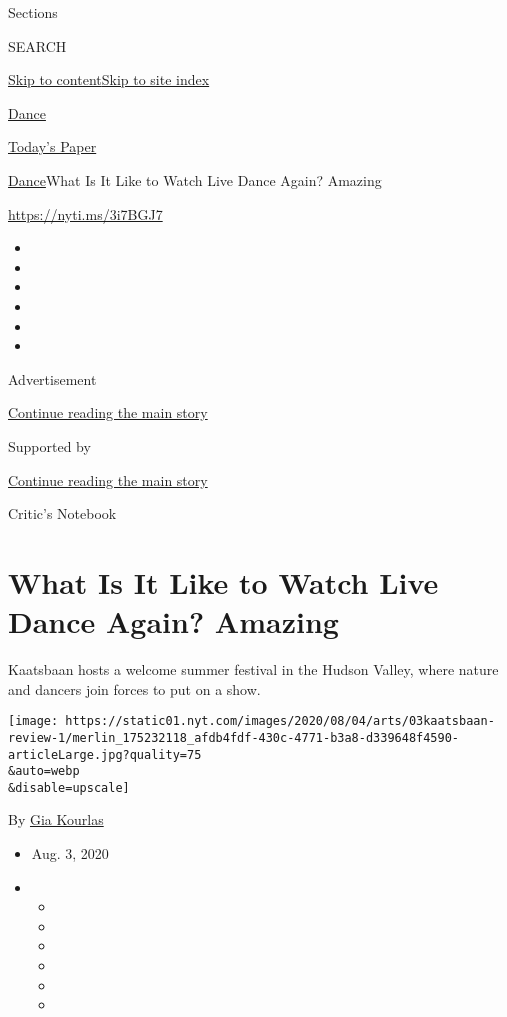 Sections

SEARCH

\protect\hyperlink{site-content}{Skip to
content}\protect\hyperlink{site-index}{Skip to site index}

\href{https://www.nytimes.com/section/arts/dance}{Dance}

\href{https://myaccount.nytimes.com/auth/login?response_type=cookie\&client_id=vi}{}

\href{https://www.nytimes.com/section/todayspaper}{Today's Paper}

\href{/section/arts/dance}{Dance}\textbar{}What Is It Like to Watch Live
Dance Again? Amazing

\url{https://nyti.ms/3i7BGJ7}

\begin{itemize}
\item
\item
\item
\item
\item
\item
\end{itemize}

Advertisement

\protect\hyperlink{after-top}{Continue reading the main story}

Supported by

\protect\hyperlink{after-sponsor}{Continue reading the main story}

Critic's Notebook

\hypertarget{what-is-it-like-to-watch-live-dance-again-amazing}{%
\section{What Is It Like to Watch Live Dance Again?
Amazing}\label{what-is-it-like-to-watch-live-dance-again-amazing}}

Kaatsbaan hosts a welcome summer festival in the Hudson Valley, where
nature and dancers join forces to put on a show.

\texttt{[image: https://static01.nyt.com/images/2020/08/04/arts/03kaatsbaan-review-1/merlin\_175232118\_afdb4fdf-430c-4771-b3a8-d339648f4590-articleLarge.jpg?quality=75\\\&auto=webp\\\&disable=upscale]}

By \href{https://www.nytimes.com/by/gia-kourlas}{Gia Kourlas}

\begin{itemize}
\item
  Aug. 3, 2020
\item
  \begin{itemize}
  \item
  \item
  \item
  \item
  \item
  \item
  \end{itemize}
\end{itemize}

